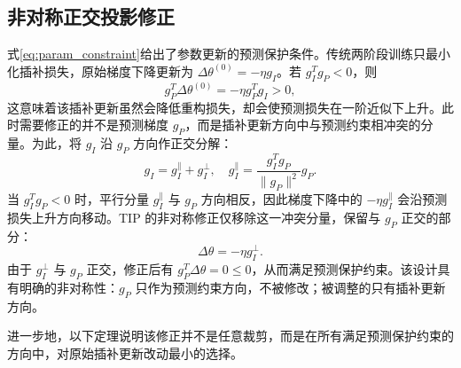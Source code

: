 \documentclass{article}
\begin{document}
\subsection{非对称正交投影修正}

式\ref{eq:param_constraint}给出了参数更新的预测保护条件。传统两阶段训练只最小化插补损失，原始梯度下降更新为 $\Delta\theta^{(0)}=-\eta g_I$。若 $g_I^T g_P < 0$，则
\[
	g_P^T\Delta\theta^{(0)}=-\eta g_P^Tg_I>0,
\]
这意味着该插补更新虽然会降低重构损失，却会使预测损失在一阶近似下上升。此时需要修正的并不是预测梯度 $g_P$，而是插补更新方向中与预测约束相冲突的分量。为此，将 $g_I$ 沿 $g_P$ 方向作正交分解：
\begin{equation}
	g_I = g_I^\parallel + g_I^\perp,\quad g_I^\parallel = \frac{g_I^T g_P}{\|g_P\|^2} g_P.
\end{equation}
当 $g_I^T g_P < 0$ 时，平行分量 $g_I^\parallel$ 与 $g_P$ 方向相反，因此梯度下降中的 $-\eta g_I^\parallel$ 会沿预测损失上升方向移动。TIP 的非对称修正仅移除这一冲突分量，保留与 $g_P$ 正交的部分：
\begin{equation}
	\Delta\theta = -\eta g_I^\perp.
\end{equation}
由于 $g_I^\perp$ 与 $g_P$ 正交，修正后有 $g_P^T\Delta\theta = 0 \leq 0$，从而满足预测保护约束。该设计具有明确的非对称性：$g_P$ 只作为预测约束方向，不被修改；被调整的只有插补更新方向。

进一步地，以下定理说明该修正并不是任意裁剪，而是在所有满足预测保护约束的方向中，对原始插补更新改动最小的选择。
\end{document}
